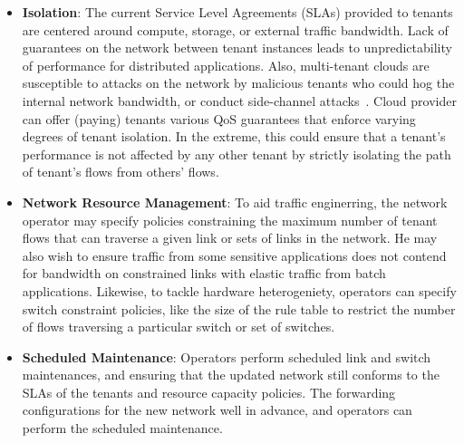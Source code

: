 \begin{itemize}
\item \textbf{Isolation}: The current Service Level Agreements (SLAs)
  provided to tenants are centered around compute, storage, or
  external traffic bandwidth. Lack of guarantees on the network
  between tenant instances leads to unpredictability of performance
  for distributed applications. Also, multi-tenant clouds are
  susceptible to attacks on the network by malicious tenants who could
  hog the internal network bandwidth, or conduct side-channel
  attacks~\cite{heyyou-ccs}. %
  Cloud provider can offer (paying) tenants various QoS guarantees
  that enforce varying degrees of tenant isolation. In the extreme,
  this could ensure that a tenant's performance is not affected by
  any other tenant by strictly isolating the path of tenant's flows
  from others' flows. 
\item \textbf{Network Resource Management}: To aid traffic
  enginerring, the network operator may specify policies constraining
  the maximum number of tenant flows that can traverse a given link or
  sets of links in the network. He may also wish to ensure traffic
  from some sensitive applications does not contend for bandwidth on
  constrained links with elastic traffic from batch applications.
  Likewise, to tackle hardware heterogeniety, operators can specify
  switch constraint policies, like the size of the rule table to
  restrict the number of flows traversing a particular switch or set
  of switches.
\item \textbf{Scheduled Maintenance}:  Operators perform scheduled link and
  switch maintenances, and ensuring that the updated network still
  conforms to the SLAs of the tenants and resource capacity
  policies.  The
  forwarding configurations for the new network well in advance, and
  operators can perform the scheduled maintenance.
\end{itemize}

